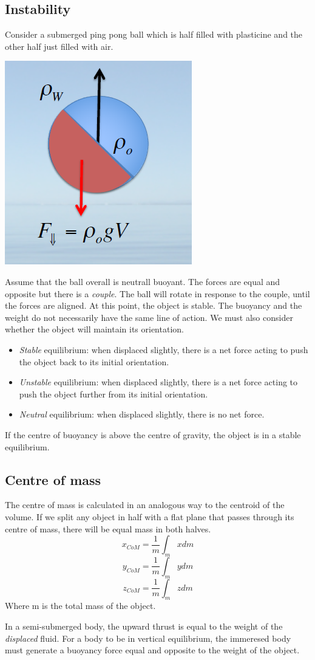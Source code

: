 \documentclass[class=report, crop=false, 12pt,a4paper]{standalone}
\begin{document}
\subsection{Instability}
Consider a submerged ping pong ball which is half filled with plasticine and the other half just filled with air.
\begin{center}
  \includegraphics[width = 0.4 \textwidth]{../img/InstabilityPingPong}
\end{center}
Assume that the ball overall is neutrall buoyant. The forces are equal and opposite but there is a \emph{couple}. The ball will rotate in response to the couple, until the forces are aligned. At this point, the object is stable. The buoyancy and the weight do not necessarily have the same line of action. We must also consider whether the object will maintain its orientation. 
\begin{itemize}
  \item \emph{Stable} equilibrium: when displaced slightly, there is a net force acting to push the object back to its initial orientation.
  \item \emph{Unstable} equilibrium: when displaced slightly, there is a net force acting to push the object further from its initial orientation.
  \item \emph{Neutral} equilibrium: when displaced slightly, there is no net force. 
\end{itemize}
If the centre of buoyancy is above the centre of gravity, the object is in a stable equilibrium. 
\subsection{Centre of mass}
The centre of mass is calculated in an analogous way to the centroid of the volume. If we split any object in half with a flat plane that passes through its centre of mass, there will be equal mass in both halves.
\[ x_{CoM} = \frac{1}{m}\int_m x dm \]
\[ y_{CoM} = \frac{1}{m}\int_m y dm \]
\[ z_{CoM} = \frac{1}{m}\int_m z dm \]
Where m is the total mass of the object. 

In a semi-submerged body, the upward thrust is equal to the weight of the \emph{displaced} fluid. For a body to be in vertical equilibrium, the immeresed body must generate a buoyancy force equal and opposite to the weight of the object.
\end{document}
